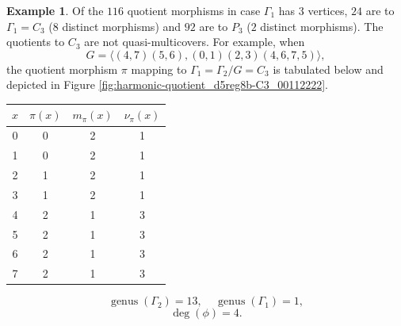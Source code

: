 \documentclass[12pt,letterpaper]{article}
\theoremstyle{definition}
\newtheorem{example}[theorem]{Example}
\DeclareMathOperator{\genus}{genus}
\begin{document}
\begin{example}
{Of the $116$ quotient morphisms in case
$\Gamma_1$ has $3$ vertices, $24$ are to $\Gamma_1=C_3$ ($8$ distinct morphisms)
and $92$ are to $P_3$ ($2$ distinct morphisms).
The quotients to $C_3$ are not quasi-multicovers.
For example, when
\[
G = \langle (4,7)(5,6), (0,1)(2,3)(4,6,7,5) \rangle ,
\]
the quotient morphism $\pi$ mapping to
$\Gamma_1=\Gamma_2/G =C_3$
is tabulated below
and  depicted in Figure \ref{fig:harmonic-quotient_d5reg8b-C3_00112222}.

\begin{center}
\begin{tabular}{c|c|c|c}  
  $x$ & $\pi(x)$ & $m_\pi(x)$ & $\nu_\pi(x)$   \\ \hline
  0   &    0   &        2         &  1  \\ 
  1   &    0   &        2         &  1  \\ 
  2   &    1   &        2         &  1  \\ 
  3   &    1   &        2         &  1   \\
  4   &    2   &        1         &  3   \\
  5   &    2   &        1         &  3   \\
  6   &    2   &        1         &  3   \\
  7   &    2   &        1         &  3   \\
\end{tabular}
\end{center}

\[
  \genus(\Gamma_2) =13,\ \ \ \ \
  \genus(\Gamma_1) =1,
\]
\[
\deg(\phi) =4.
\]

}
\end{example}
\end{document}
